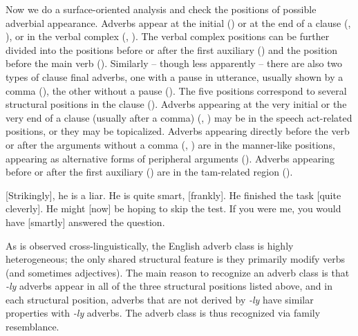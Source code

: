 \documentclass[UTF8, a4paper, oneside, scheme=plain, 12pt]{ctexbook}
\newcommand{\form}[1]{\emph{#1}}
\begin{document}
Now we do a surface-oriented analysis and check the positions of possible adverbial appearance.
Adverbs appear at the initial () or
at the end of a clause (, ), 
or in the verbal complex (, ).
The verbal complex positions can be further divided into 
the positions before or after the first auxiliary ()
and the position before the main verb ().
Similarly -- though less apparently -- 
there are also two types of clause final adverbs,
one with a pause in utterance, usually shown by a comma (),
the other without a pause ().
The five positions correspond to several structural positions in the clause  
().
Adverbs appearing at the very initial or the very end of a clause (usually after a comma)
(, ) 
may be in the speech act-related positions,
or they may be topicalized.
Adverbs appearing directly before the verb 
or after the arguments without a comma 
(, ) 
are in the manner-like positions,
appearing as alternative forms of peripheral arguments
().
Adverbs appearing before or after the first auxiliary () 
are in the \acs{tam}-related region ().

\begin{exe}
    \ex\label{ex:overview.adverb-1} [Strikingly], he is a liar.
    \ex\label{ex:overview.adverb-2} He is quite smart, [frankly].
    \ex\label{ex:overview.adverb-5} He finished the task [quite cleverly].
    \ex\label{ex:overview.adverb-3} He might [now] be hoping to skip the test.
    \ex\label{ex:overview.adverb-4} If you were me, you would have [smartly] answered the question.
\end{exe}

As is observed cross-linguistically,
the English adverb class is highly heterogeneous;
the only shared structural feature 
is they primarily modify verbs 
(and sometimes adjectives).
The main reason to recognize an adverb class 
is that \form{-ly} adverbs appear in all of the three structural positions listed above, 
and in each structural position, 
adverbs that are not derived by \form{-ly} 
have similar properties with \form{-ly} adverbs.
The adverb class is thus recognized via family resemblance.
\end{document}
